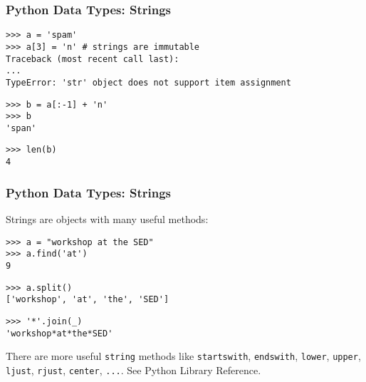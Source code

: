 \begin{frame}[fragile]
    \frametitle{Python Data Types: Strings}
    \begin{myColorBox}{0.9}{}
\begin{verbatim}
>>> a = 'spam'
>>> a[3] = 'n' # strings are immutable
Traceback (most recent call last):
...
TypeError: 'str' object does not support item assignment
\end{verbatim}
    \end{myColorBox}
    \pause
    \begin{myColorBox}{0.9}{}
\begin{verbatim}
>>> b = a[:-1] + 'n'
>>> b
'span'
\end{verbatim}
    \end{myColorBox}
    \pause
    \begin{myColorBox}{0.9}{}
\begin{verbatim}
>>> len(b)
4
\end{verbatim}
    \end{myColorBox}
\end{frame}


\begin{frame}[fragile]
    \frametitle{Python Data Types: Strings}
    Strings are objects with many useful methods:
    \begin{myColorBox}{0.9}{}
\begin{verbatim}
>>> a = "workshop at the SED"
>>> a.find('at')
9
\end{verbatim}
    \end{myColorBox}
    \pause
    \begin{myColorBox}{0.9}{}
\begin{verbatim}
>>> a.split()
['workshop', 'at', 'the', 'SED']
\end{verbatim}
    \end{myColorBox}
    \pause
    \begin{myColorBox}{0.9}{}
\begin{verbatim}
>>> '*'.join(_)
'workshop*at*the*SED'
\end{verbatim}
    \end{myColorBox}
    There are more useful \verb#string# methods like \verb#startswith#, \verb#endswith#, \verb#lower#, \verb#upper#,
    \verb#ljust#, \verb#rjust#, \verb#center#, \verb#...#. See Python Library Reference.
\end{frame}

